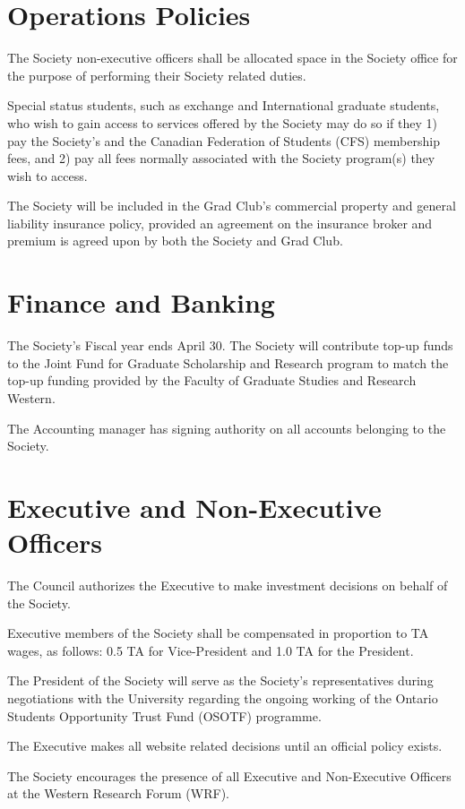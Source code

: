 \section{Operations Policies}
\begin{longenum}[ label*=\thesection.\arabic*., align=left]
\item The Society non-executive officers shall be allocated space in the Society office for the purpose of performing their Society related duties.
\item Special status students, such as exchange and International graduate students, who wish to gain access to services offered by the Society may do so if they 1) pay the Society’s and the Canadian Federation of Students (CFS) membership fees, and 2) pay all fees normally associated with the Society program(s) they wish to access.
\item The Society will be included in the Grad Club’s commercial property and general liability insurance policy, provided an agreement on the insurance broker and premium is agreed upon by both the Society and Grad Club.
\end{longenum}

\section{Finance and Banking}
\begin{longenum}[ label*=\thesection.\arabic*., align=left]
\item The Society’s Fiscal year ends April 30. The Society will contribute top-up funds to the Joint Fund for Graduate Scholarship and Research program to match the top-up funding provided by the Faculty of Graduate Studies and Research Western.
\item The Accounting manager has signing authority on all accounts belonging to the Society.
\end{longenum}

\section{Executive and Non-Executive Officers}
\begin{longenum}[ label*=\thesection.\arabic*., align=left]
\item The Council authorizes the Executive to make investment decisions on behalf of the Society.
\item Executive members of the Society shall be compensated in proportion to TA wages, as follows: 0.5 TA for Vice-President and 1.0 TA for the President.
\item The President of the Society will serve as the Society’s representatives during negotiations with the University regarding the ongoing working of the Ontario Students Opportunity Trust Fund (OSOTF) programme.
\item The Executive makes all website related decisions until an official policy exists.
\item The Society encourages the presence of all Executive and Non-Executive Officers at the Western Research Forum (WRF).
\end{longenum}

